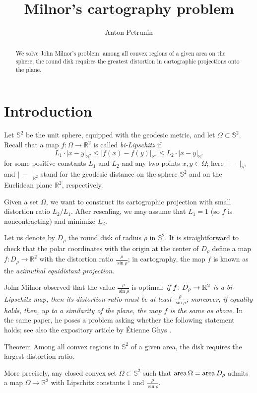 \documentclass[a4paper,10pt]{article}
\def\thetitle{Milnor's cartography problem}
\def\theauthors{Anton Petrunin}
\begin{document}
\title{\thetitle}
\author{\theauthors}
\date{}
\maketitle

\begin{abstract}
We solve John Milnor's problem: among all convex regions of a given area on the sphere, the round disk requires the greatest distortion in cartographic projections onto the plane.
\end{abstract}

\section{Introduction}

Let $\mathbb{S}^2$ be the unit sphere, equipped with the geodesic metric, and let $\Omega\subset\mathbb{S}^2$.
Recall that a map $f\colon\Omega\to\mathbb{R}^2$ is called \emph{bi-Lipschitz} if
\[L_1\cdot|x-y|_{\mathbb{S}^2}\leqslant |f(x)-f(y)|_{\mathbb{R}^2}\leqslant L_2\cdot|x-y|_{\mathbb{S}^2}\]
for some positive constants $L_1$ and $L_2$ and any two points $x,y\in \Omega$;
here $|\ -\ |_{\mathbb{S}^2}$ and $|\ -\ |_{\mathbb{R}^2}$ stand for the geodesic distance on the sphere $\mathbb{S}^2$ and on the Euclidean plane $\mathbb{R}^2$, respectively.

Given a set $\Omega$, we want to construct its cartographic projection with small distortion ratio $L_2/L_1$.
After rescaling, we may assume that $L_1=1$ (so $f$ is noncontracting) and minimize $L_2$.

Let us denote by $D_\rho$ the round disk of radius $\rho$ in $\mathbb{S}^2$.
It is straightforward to check that the polar coordinates with the origin at the center of $D_\rho$ define a
map $f\colon D_\rho\to\mathbb{R}^2$ with the distortion ratio $\tfrac{\rho}{\sin \rho}$;
in cartography, the map $f$ is known as the \emph{azimuthal equidistant projection}.


John Milnor \cite{milnor} observed that the value $\tfrac{\rho}{\sin \rho}$ is optimal: \textit{if $f\colon D_\rho\z\to\mathbb{R}^2$ is a bi-Lipschitz map,
then its distortion ratio must be at least $\tfrac{\rho}{\sin \rho}$; moreover, if equality holds, then, up to a similarity of the plane, the map $f$ is the same as above.}
In the same paper, he poses a problem asking whether the following statement holds; see also the expository article by Étienne Ghys \cite{ghys}.

\begin{thm}{Theorem}\label{prob:main}
Among all convex regions in $\mathbb{S}^2$ of a given area, the disk requires the largest distortion ratio.

More precisely, any closed convex set $\Omega\subset\mathbb{S}^2$ such that $\mathrm{area}\, \Omega=\mathrm{area}\, D_\rho$ admits a map $\Omega\to\mathbb{R}^2$ with Lipschitz constants $1$ and $\tfrac \rho{\sin \rho}$.
\end{thm}
\end{document}

